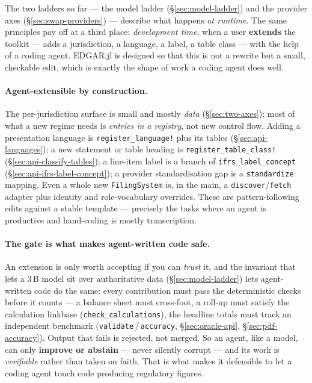 \documentclass[11pt,a4paper]{report}
\begin{document}
The two ladders so far --- the model ladder (\S\ref{sec:model-ladder}) and the provider axes
(\S\ref{sec:swap-providers}) --- describe what happens \emph{at runtime}. The same principles pay off at a third
place: \emph{development time}, when a user \textbf{extends} the toolkit --- adds a jurisdiction, a language, a
label, a table class --- with the help of a coding agent. EDGAR.jl is designed so that this is not a rewrite but
a small, checkable edit, which is exactly the shape of work a coding agent does well.

\paragraph{Agent-extensible by construction.} The per-jurisdiction surface is small and mostly \emph{data}
(\S\ref{sec:two-axes}): most of what a new regime needs is \emph{entries in a registry}, not new control flow.
Adding a presentation language is \texttt{register\_language!} plus its tables (\S\ref{sec:api-languages}); a new
statement or table heading is \texttt{register\_table\_class!} (\S\ref{sec:api-classify-tables}); a line-item
label is a branch of \texttt{ifrs\_label\_concept} (\S\ref{sec:api-ifrs-label-concept}); a provider
standardisation gap is a \texttt{standardize} mapping. Even a whole new \texttt{FilingSystem} is, in the main, a
\texttt{discover}/\texttt{fetch} adapter plus identity and role-vocabulary overrides. These are pattern-following
edits against a stable template --- precisely the tasks where an agent is productive and hand-coding is mostly
transcription.

\paragraph{The gate is what makes agent-written code safe.} An extension is only worth accepting if you can
\emph{trust} it, and the invariant that lets a 3\,B model sit over authoritative data (\S\ref{sec:model-ladder})
lets agent-written code do the same: every contribution must pass the deterministic checks before it counts ---
a balance sheet must cross-foot, a roll-up must satisfy the calculation linkbase (\texttt{check\_calculations}),
the headline totals must track an independent benchmark (\texttt{validate}\,/\,\texttt{accuracy},
\S\ref{sec:oracle-api}, \S\ref{sec:pdf-accuracy}). Output that fails is rejected, not merged. So an agent, like a
model, can only \textbf{improve or abstain} --- never silently corrupt --- and its work is \emph{verifiable}
rather than taken on faith. That is what makes it defensible to let a coding agent touch code producing
regulatory figures.
\end{document}
